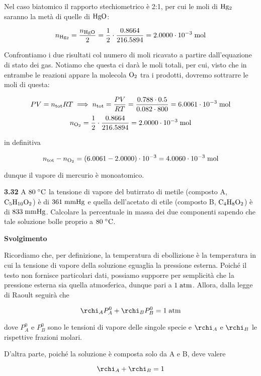 Nel caso biatomico il rapporto stechiometrico è 2:1, per cui le moli di $\rm Hg_2$ saranno la metà di quelle di $\rm HgO$:

$$n_{\rm Hg_2}=\frac{n_{\rm HgO}}{2}
=\frac{1}{2} \cdot \frac{0.8664}{216.5894}
=2.0000 \cdot 10^{-3} \; \rm mol$$

Confrontiamo i due risultati col numero di moli ricavato a partire dall'equazione di stato dei gas. Notiamo che questa ci darà le moli totali, per cui, visto che in entrambe le reazioni appare la molecola $\rm O_2$ tra i prodotti, dovremo sottrarre le moli di questa:

$$PV=n_{\rm tot}RT
\implies
n_{\rm tot}=\frac{PV}{RT}
=\frac{0.788 \cdot 0.5}{0.082 \cdot 800}
=6.0061 \cdot 10^{-3} \; \rm mol$$
$$n_{\rm O_2}
=\frac{1}{2} \cdot \frac{0.8664}{216.5894}
=2.0000 \cdot 10^{-3} \; \rm mol$$

in definitiva

$$n_{\rm tot} - n_{\rm O_2}
=(6.0061 - 2.0000) \cdot 10^{-3}
=4.0060 \cdot 10^{-3} \; \rm mol$$

dunque il vapore di mercurio è monoatomico.

\vspace{0.2cm}\textbf{3.32} A $80 \; \rm ^{\circ} C$ la tensione di vapore del butirrato di metile (composto A, $\rm C_5H_{10}O_2$) è di $361 \; \rm mmHg$ e quella dell'acetato di etile (composto B, $\rm C_4H_8O_2$) è di $833 \; \rm mmHg$. Calcolare la percentuale in massa dei due componenti sapendo che tale soluzione bolle proprio a $80 \; \rm ^{\circ} C$.

\vspace{0.2cm}\large\textbf{Svolgimento}\normalsize

\vspace{0.2cm}Ricordiamo che, per definizione, la temperatura di ebollizione è la temperatura in cui la tensione di vapore della soluzione eguaglia la pressione esterna. Poiché il testo non fornisce particolari dati, possiamo supporre per semplicità che la pressione esterna sia quella atmosferica, dunque pari a $1 \; \rm atm$. Allora, dalla legge di Raoult seguirà che

$$\rchi_A P_A^0 + \rchi_B P_B^0=1 \; \rm atm$$

dove $P_A^0$ e $P_B^0$ sono le tensioni di vapore delle singole specie e $\rchi_A$ e $\rchi_B$ le rispettive frazioni molari.

D'altra parte, poiché la soluzione è composta solo da A e B, deve valere

$$\rchi_A + \rchi_B=1$$

